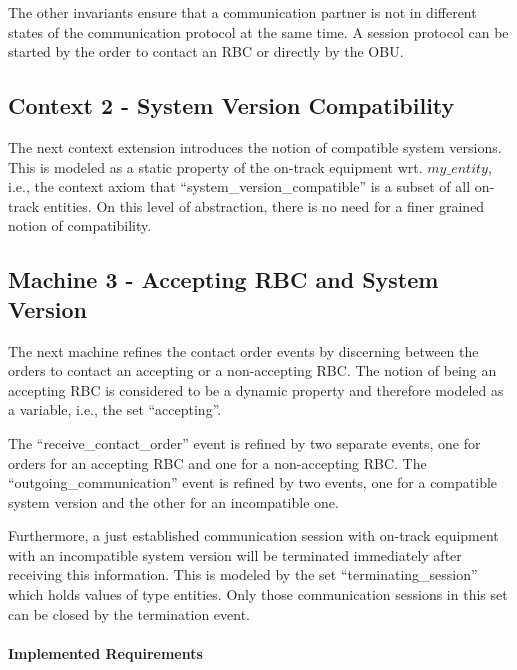 \documentclass{template/openetcs_article}
\begin{document}
The other invariants ensure that a communication partner is not in different
states of the communication protocol at the same time. A session protocol can be
started by the order to contact an RBC or directly by the OBU.



\subsection{Context 2 - System Version Compatibility}
\label{sec:context-2-system}

The next context extension introduces the notion of compatible system
versions. This is modeled as a static property of the on-track equipment
wrt. $my\_entity$, i.e., the context axiom that ``system\_version\_compatible''
is a subset of all on-track entities. On this level of abstraction, there is no
need for a finer grained notion of compatibility.



\subsection{Machine 3 - Accepting RBC and System Version}
\label{sec:machine-3-accepting}

The next machine refines the contact order events by discerning between the
orders to contact an accepting or a non-accepting RBC. The notion of being an
accepting RBC is considered to be a dynamic property and therefore modeled as a
variable, i.e., the set ``accepting''.

The ``receive\_contact\_order'' event is refined by two separate events, one for
orders for an accepting RBC and one for a non-accepting RBC. The
``outgoing\_communication'' event is refined by two events, one for a compatible
system version and the other for an incompatible one.

Furthermore, a just established communication session with on-track equipment
with an incompatible system version will be terminated immediately after
receiving this information. This is modeled by the set ``terminating\_session''
which holds values of type entities. Only those communication sessions in this
set can be closed by the termination event.

\paragraph{Implemented Requirements}
\label{sec:impl-requ-2}
\end{document}
